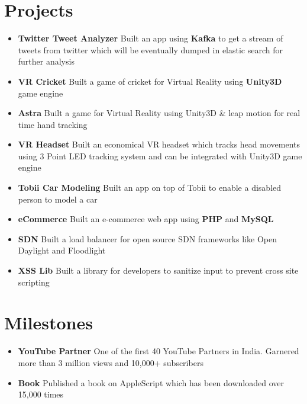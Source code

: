 \documentclass[a4paper,12pt]{article} %
\newcommand\zeroSpacing{0em}
\newcommand{\generalListStart}{\vspace{\zeroSpacing}\begin{itemize}[leftmargin=2em]\setlength\itemsep{-0.4em}}
\newcommand{\generalListEnd}{\end{itemize}\vspace{\zeroSpacing}}
\newcommand{\oneKeyValuePairElement}[2]{
	\item \textbf{#1}{ #2}
}
\begin{document}

\vspace{\zeroSpacing}\section*{Projects}
\generalListStart
	\vspace{-0.5em}\oneKeyValuePairElement{Twitter Tweet Analyzer}{Built an app using \textbf{Kafka} to get a stream of tweets from twitter which will be eventually dumped in elastic search for further analysis}
	\oneKeyValuePairElement{VR Cricket}{Built a game of cricket for Virtual Reality using \textbf{Unity3D} game engine}
	\oneKeyValuePairElement{Astra}{Built a game for Virtual Reality using Unity3D \& leap motion for real time hand tracking}
	\oneKeyValuePairElement{VR Headset}{Built an economical VR headset which tracks head movements using 3 Point LED tracking system and can be integrated with Unity3D game engine}
	\oneKeyValuePairElement{Tobii Car Modeling}{Built an app on top of Tobii to enable a disabled person to model a car}
	\oneKeyValuePairElement{eCommerce}{Built an e-commerce web app using \textbf{PHP} and \textbf{MySQL}}
	\oneKeyValuePairElement{SDN}{Built a load balancer for open source SDN frameworks like Open Daylight and Floodlight}
	\oneKeyValuePairElement{XSS Lib}{Built a library for developers to sanitize input to prevent cross site scripting}\vspace{\zeroSpacing}
\generalListEnd


\vspace{\zeroSpacing}\section*{Milestones}

\generalListStart
	\vspace{-0.5em}\oneKeyValuePairElement{YouTube Partner}{One of the first 40 YouTube Partners in India. Garnered more than 3 million views and 10,000+ subscribers}
	\oneKeyValuePairElement{Book}{Published a book on AppleScript which has been downloaded over 15,000 times}
\generalListEnd
\end{document}
